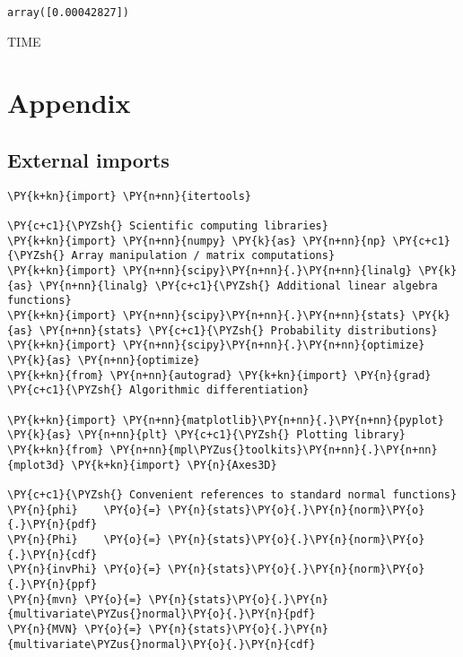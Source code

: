             \begin{tcolorbox}[breakable, size=fbox, boxrule=.5pt, pad at break*=1mm, opacityfill=0]
\begin{Verbatim}[commandchars=\\\{\}]
array([0.00042827])
\end{Verbatim}
\end{tcolorbox}
        
    TIME
    
    
\pagebreak

    \hypertarget{appendix}{%
\section{Appendix}\label{appendix}}

    \hypertarget{external-imports}{%
\subsection{External imports}\label{external-imports}}

    \begin{tcolorbox}[breakable, size=fbox, boxrule=1pt, pad at break*=1mm,colback=cellbackground, colframe=cellborder]
\begin{Verbatim}[commandchars=\\\{\}]
\PY{k+kn}{import} \PY{n+nn}{itertools}

\PY{c+c1}{\PYZsh{} Scientific computing libraries}
\PY{k+kn}{import} \PY{n+nn}{numpy} \PY{k}{as} \PY{n+nn}{np} \PY{c+c1}{\PYZsh{} Array manipulation / matrix computations}
\PY{k+kn}{import} \PY{n+nn}{scipy}\PY{n+nn}{.}\PY{n+nn}{linalg} \PY{k}{as} \PY{n+nn}{linalg} \PY{c+c1}{\PYZsh{} Additional linear algebra functions}
\PY{k+kn}{import} \PY{n+nn}{scipy}\PY{n+nn}{.}\PY{n+nn}{stats} \PY{k}{as} \PY{n+nn}{stats} \PY{c+c1}{\PYZsh{} Probability distributions}
\PY{k+kn}{import} \PY{n+nn}{scipy}\PY{n+nn}{.}\PY{n+nn}{optimize} \PY{k}{as} \PY{n+nn}{optimize} 
\PY{k+kn}{from} \PY{n+nn}{autograd} \PY{k+kn}{import} \PY{n}{grad} \PY{c+c1}{\PYZsh{} Algorithmic differentiation}

\PY{k+kn}{import} \PY{n+nn}{matplotlib}\PY{n+nn}{.}\PY{n+nn}{pyplot} \PY{k}{as} \PY{n+nn}{plt} \PY{c+c1}{\PYZsh{} Plotting library}
\PY{k+kn}{from} \PY{n+nn}{mpl\PYZus{}toolkits}\PY{n+nn}{.}\PY{n+nn}{mplot3d} \PY{k+kn}{import} \PY{n}{Axes3D}

\PY{c+c1}{\PYZsh{} Convenient references to standard normal functions}
\PY{n}{phi}    \PY{o}{=} \PY{n}{stats}\PY{o}{.}\PY{n}{norm}\PY{o}{.}\PY{n}{pdf}
\PY{n}{Phi}    \PY{o}{=} \PY{n}{stats}\PY{o}{.}\PY{n}{norm}\PY{o}{.}\PY{n}{cdf}
\PY{n}{invPhi} \PY{o}{=} \PY{n}{stats}\PY{o}{.}\PY{n}{norm}\PY{o}{.}\PY{n}{ppf}
\PY{n}{mvn} \PY{o}{=} \PY{n}{stats}\PY{o}{.}\PY{n}{multivariate\PYZus{}normal}\PY{o}{.}\PY{n}{pdf}
\PY{n}{MVN} \PY{o}{=} \PY{n}{stats}\PY{o}{.}\PY{n}{multivariate\PYZus{}normal}\PY{o}{.}\PY{n}{cdf}
\end{Verbatim}
\end{tcolorbox}

